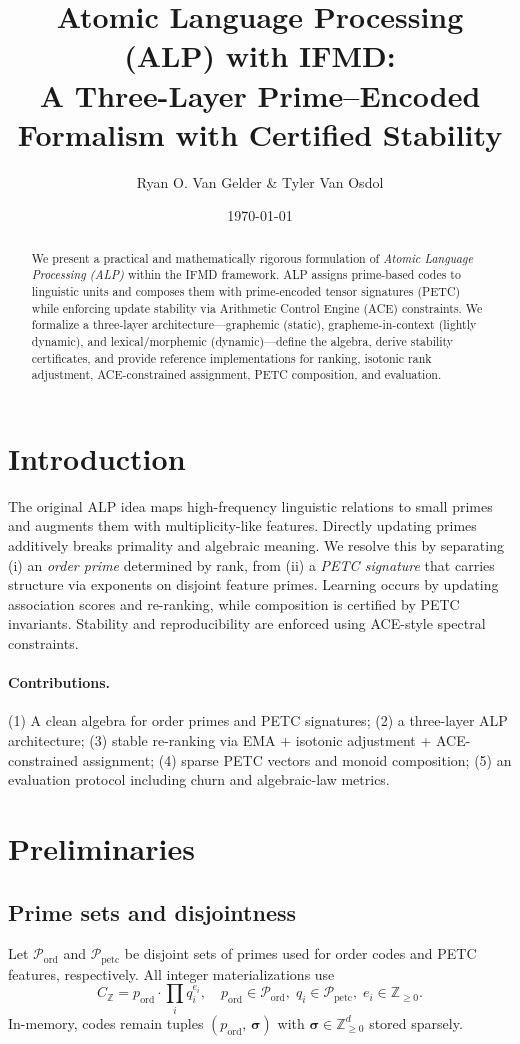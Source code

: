 \documentclass[11pt]{article}
\title{Atomic Language Processing (ALP) with IFMD: \\
A Three-Layer Prime--Encoded Formalism with Certified Stability}
\author{Ryan O. Van Gelder \& Tyler Van Osdol}
\date{\today}
\newcommand{\Z}{\mathbb{Z}}
\newcommand{\PP}{\mathcal{P}}
\newcommand{\sig}{\boldsymbol{\sigma}}
\begin{document}
\maketitle

\begin{abstract}
We present a practical and mathematically rigorous formulation of \emph{Atomic Language Processing (ALP)} within the IFMD framework. ALP assigns prime-based codes to linguistic units and composes them with prime-encoded tensor signatures (PETC) while enforcing update stability via Arithmetic Control Engine (ACE) constraints. We formalize a three-layer architecture---graphemic (static), grapheme-in-context (lightly dynamic), and lexical/morphemic (dynamic)---define the algebra, derive stability certificates, and provide reference implementations for ranking, isotonic rank adjustment, ACE-constrained assignment, PETC composition, and evaluation.
\end{abstract}

\tableofcontents

\section{Introduction}
The original ALP idea maps high-frequency linguistic relations to small primes and augments them with multiplicity-like features. Directly updating primes additively breaks primality and algebraic meaning. We resolve this by separating (i) an \emph{order prime} determined by rank, from (ii) a \emph{PETC signature} that carries structure via exponents on disjoint feature primes. Learning occurs by updating association scores and re-ranking, while composition is certified by PETC invariants. Stability and reproducibility are enforced using ACE-style spectral constraints.

\paragraph{Contributions.} (1) A clean algebra for order primes and PETC signatures; (2) a three-layer ALP architecture; (3) stable re-ranking via EMA + isotonic adjustment + ACE-constrained assignment; (4) sparse PETC vectors and monoid composition; (5) an evaluation protocol including churn and algebraic-law metrics.

\section{Preliminaries}
\subsection{Prime sets and disjointness}
Let $\PP_\text{ord}$ and $\PP_\text{petc}$ be disjoint sets of primes used for order codes and PETC features, respectively. All integer materializations use
\begin{equation}
  C_\mathbb{Z} = p_{\text{ord}} \cdot \prod_{i} q_i^{e_i}, \quad p_{\text{ord}}\in\PP_\text{ord},\; q_i\in\PP_\text{petc},\; e_i\in\Z_{\ge 0}.
\end{equation}
In-memory, codes remain tuples $(p_{\text{ord}},\,\sig)$ with $\sig\in\Z^{d}_{\ge 0}$ stored sparsely.
\end{document}

